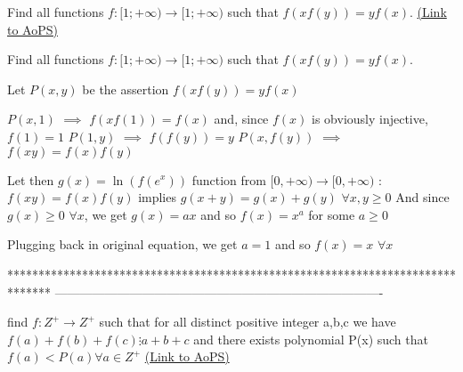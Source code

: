 \begin{problem}
	Find all  functions ${{f: \mathbb[1;+\infty)}\to\mathbb[1;+\infty)}$ such that $f(xf(y))=yf(x)$.
	\flushright \href{https://artofproblemsolving.com/community/c6h564046}{(Link to AoPS)}
\end{problem}



\begin{solution}
	\begin{tcolorbox}Find all  functions ${{f: \mathbb[1;+\infty)}\to\mathbb[1;+\infty)}$ such that $f(xf(y))=yf(x)$.\end{tcolorbox}
Let $P(x,y)$ be the assertion $f(xf(y))=yf(x)$

$P(x,1)$ $\implies$ $f(xf(1))=f(x)$ and, since $f(x)$ is obviously injective, $f(1)=1$
$P(1,y)$ $\implies$ $f(f(y))=y$
$P(x,f(y))$ $\implies$ $f(xy)=f(x)f(y)$

Let then $g(x)=\ln (f(e^x))$ function from $[0,+\infty)\to [0,+\infty)$ :
$f(xy)=f(x)f(y)$ implies $g(x+y)=g(x)+g(y)$ $\forall x,y\ge 0$
And since $g(x)\ge 0$ $\forall x$, we get $g(x)=ax$ and so $f(x)=x^a$ for some $a\ge 0$

Plugging back in original equation, we get $a=1$ and so $\boxed{f(x)=x}$ $\forall x$
\end{solution}
*******************************************************************************
-------------------------------------------------------------------------------

\begin{problem}
	find $f:Z^{+} \to Z^{+}$ such that for all distinct positive integer a,b,c we have $f(a)+f(b)+f(c) \vdots a+b+c$ and there exists polynomial P(x) such that $f(a)<P(a) \forall a \in Z^{+}$
	\flushright \href{https://artofproblemsolving.com/community/c6h564055}{(Link to AoPS)}
\end{problem}




